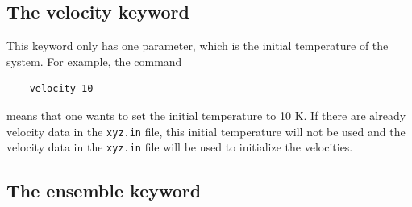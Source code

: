 \documentclass[12pt,a4paper]{report}
\begin{document}
\subsection{The velocity keyword}

This keyword only has one parameter, which is the initial temperature of the system. For example, the command
\begin{verbatim}
    velocity 10
\end{verbatim}
means that one wants to set the initial temperature to 10 K. If there are already velocity data in the \verb"xyz.in" file, this initial temperature will not be used and the velocity data in the \verb"xyz.in" file will be used to initialize the velocities.

\subsection{The ensemble keyword}
\end{document}
